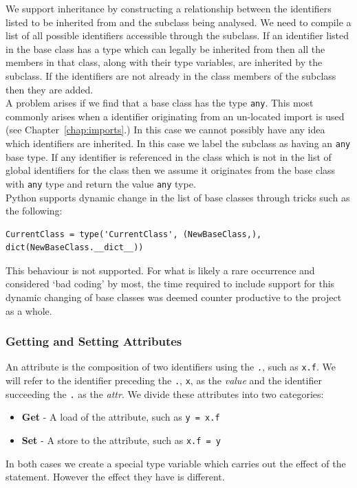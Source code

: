 \documentclass[12pt, titlepage]{article}
\begin{document}
\indent We support inheritance by constructing a relationship between the identifiers listed to be inherited from and the subclass being analysed. We need to compile a list of all possible identifiers accessible through the subclass. If an identifier listed in the base class has a type which can legally be inherited from then all the members in that class, along with their type variables, are inherited by the subclass. If the identifiers are not already in the class members of the subclass then they are added. \\
\indent A problem arises if we find that a base class has the type \texttt{any}. This most commonly arises when a identifier originating from an un-located import is used (see Chapter~\ref{chap:imports}.) In this case we cannot possibly have any idea which identifiers are inherited. In this case we label the subclass as having an \texttt{any} base type. If any identifier is referenced in the class which is not in the list of global identifiers for the class then we assume it originates from the base class with \texttt{any} type and return the value \texttt{any} type. \\
\indent Python supports dynamic change in the list of base classes through tricks such as the following:
\begin{lstlisting}[mathescape]
CurrentClass = type('CurrentClass', (NewBaseClass,), dict(NewBaseClass.__dict__))
\end{lstlisting}
This behaviour is not supported. For what is likely a rare occurrence and considered `bad coding' by most, the time required to include support for this dynamic changing of base classes was deemed counter productive to the project as a whole.

\subsubsection{Getting and Setting Attributes}
An attribute is the composition of two identifiers using the \texttt{.}, such as \texttt{x.f}. We will refer to the identifier preceding the \texttt{.}, \texttt{x}, as the \textit{value} and the identifier succeeding the \texttt{.} as the \textit{attr}.  We divide these attributes into two categories:
\begin{itemize}
	\item \textbf{Get} - A load of the attribute, such as \texttt{y = x.f}
	\item \textbf{Set} - A store to the attribute, such as \texttt{x.f = y}
\end{itemize}
In both cases we create a special type variable which carries out the effect of the statement. However the effect they have is different.
\end{document}
